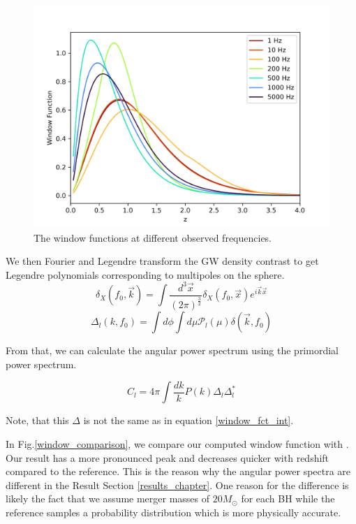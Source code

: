 \begin{figure}
    \centering
    \includegraphics[width=1\linewidth]{Images/window_diff_frequencies.png}
    \caption{The window functions at different observed frequencies.}
    \label{window_frequencies}
\end{figure} 

We then Fourier and Legendre transform the GW density contrast to get Legendre polynomials corresponding to multipoles on the sphere.
\begin{equation}
    \delta_X(f_0, \vec{k}) = \int \frac{d^3\vec{x}}{(2\pi)^\frac{3}{2}} 
    \delta_X(f_0, \vec{x}) e^{i\vec{k}\vec{x}}
\end{equation}
\begin{equation}
    \Delta_l(k, f_0) = \int d\phi \int d\mu \mathcal{P}_l(\mu) 
    \delta(\vec{k}, f_0)
\end{equation}

From that, we can calculate the angular power spectrum using the primordial power 
spectrum.

\begin{equation}
    C_l = 4\pi \int \frac{dk}{k} P(k) \Delta_l \Delta_l^*
\end{equation}

Note, that this $\Delta$ is not the same as in equation \ref{window_fct_int}.

In Fig.\ref{window_comparison}, we compare our computed window function with \cite{dallarmi_dipole_2022}. Our result has a more pronounced peak and decreases quicker with redshift compared to the reference. This is the reason why the angular power spectra are different in the Result Section \ref{results_chapter}. One reason for the difference is likely the fact that we assume merger masses of $20 M_\odot$ for each BH while the reference samples a probability distribution which is more physically accurate.

